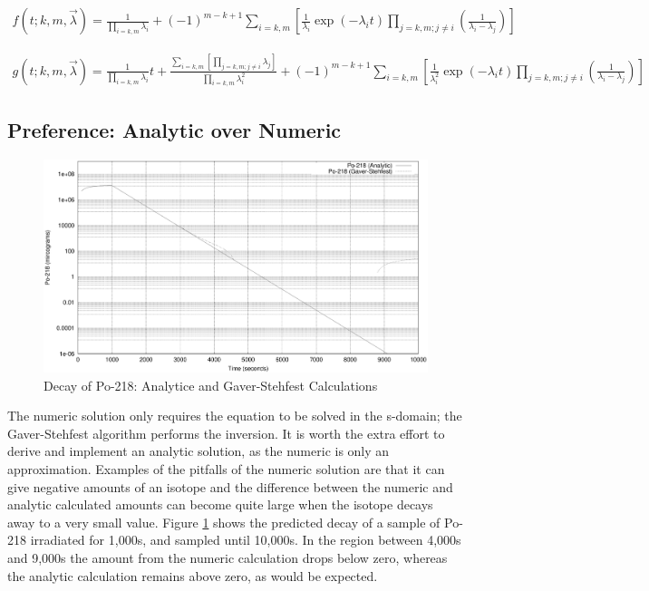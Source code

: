 \documentclass[12pt,twoside]{manual}
\begin{document}
\begin{equation}
\begin{split}
f(t;k,m,\vec{\lambda})
= \frac{1}{\prod_{i=k,m} \lambda_i }
+ \left( -1 \right)^{m-k+1}
\sum_{i=k,m}
\left[
\frac{1}{\lambda_i }
\exp(-\lambda_i t)
\prod_{j=k,m;j\neq i}
\left(
\frac{1}{\lambda_i - \lambda_j}
\right )
\right]
\end{split}
\end{equation}

\begin{equation}
\begin{split}
g(t;k,m,\vec{\lambda})
= \frac{1}{\prod_{i=k,m} \lambda_i } t
+ \frac{\sum_{i=k,m} \left[ \prod_{j=k,m; j \neq i} \lambda_{j} \right]}
{\prod_{i=k,m} \lambda_{i}^2}
+ \left( -1 \right)^{m-k+1}
\sum_{i=k,m}
\left[
\frac{1}{\lambda_i^2}
\exp(-\lambda_i t)
\prod_{j=k,m;j\neq i}
\left(
\frac{1}{\lambda_i - \lambda_j}
\right)
\right]
\end{split}
\end{equation}

\FloatBarrier
\subsection{Preference: Analytic over Numeric}

\begin{figure}
	\begin{center}
		\includegraphics[width=15.0cm]{img/po218_po218.eps}
		\caption{Decay of Po-218: Analytice and Gaver-Stehfest Calculations \cite{jeff311}}
		\label{fig:po218decay}
	\end{center}
\end{figure}

The numeric solution only requires the equation to be solved in the s-domain; the Gaver-Stehfest algorithm performs the inversion.  It is worth the extra effort to derive and implement an analytic solution, as the numeric is only an approximation.  Examples of the pitfalls of the numeric solution are that it can give negative amounts of an isotope and the difference between the numeric and analytic calculated amounts can become quite large when the isotope decays away to a very small value.  Figure \ref{fig:po218decay} shows the predicted decay of a sample of Po-218 irradiated for 1,000s, and sampled until 10,000s.  In the region between 4,000s and 9,000s the amount from the numeric calculation drops below zero, whereas the analytic calculation remains above zero, as would be expected.
\end{document}
